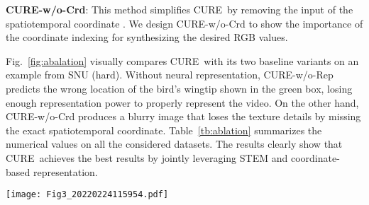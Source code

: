 \documentclass[12pt]{article}
\def\proposed{CURE}
\begin{document}
\textbf{\proposed-w/o-Crd}: This method simplifies \proposed~by removing the input of the spatiotemporal coordinate . We design \proposed-w/o-Crd to show the importance of the coordinate indexing for synthesizing the desired RGB values.


Fig.~\ref{fig:abalation} visually compares \proposed~with its two baseline variants on an example from SNU (hard). Without neural representation, \proposed-w/o-Rep predicts the wrong location of the bird's wingtip shown in the green box, losing enough representation power to properly represent the video. On the other hand, \proposed-w/o-Crd produces a blurry image that loses the texture details by missing the exact spatiotemporal coordinate. Table~\ref{tb:ablation} summarizes the numerical values on all the considered datasets. The results clearly show that \proposed~achieves the best results by jointly leveraging STEM and coordinate-based representation.



\begin{figure*}[t!]
  \centering
  \texttt{[image: Fig3\_20220224115954.pdf]}
  \caption{Visual illustration of the importance of the various components of \proposed. The green and yellow boxes highlight the improvements in terms of accuracy and sharpness due to the full \proposed~compared to its ablated variants.}
  \label{fig:abalation}
\end{figure*}
\end{document}
